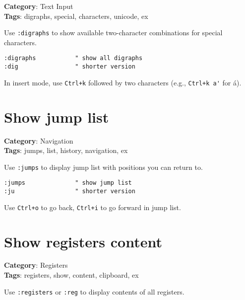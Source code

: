 {{{{{{\textbf{Category}: Text Input\\ \textbf{Tags}: digraphs, special, characters, unicode, ex
\vspace{0.5cm}

Use {\footnotesize \Verb§:digraphs§} to show available two-character combinations for special characters.

\begin{Exa*}{}
\begin{Verbatim}[fontsize=\footnotesize, breaklines, breakanywhere]
:digraphs           " show all digraphs
:dig                " shorter version
\end{Verbatim}
\end{Exa*}

In insert mode, use {\footnotesize \Verb§Ctrl+k§} followed by two characters (e.g., {\footnotesize \Verb§Ctrl+k a'§} for á).

\section{Show jump list}

\textbf{Category}: Navigation\\ \textbf{Tags}: jumps, list, history, navigation, ex
\vspace{0.5cm}

Use {\footnotesize \Verb§:jumps§} to display jump list with positions you can return to.

\begin{Exa*}{}
\begin{Verbatim}[fontsize=\footnotesize, breaklines, breakanywhere]
:jumps              " show jump list
:ju                 " shorter version
\end{Verbatim}
\end{Exa*}

Use {\footnotesize \Verb§Ctrl+o§} to go back, {\footnotesize \Verb§Ctrl+i§} to go forward in jump list.

\section{Show registers content}

\textbf{Category}: Registers\\ \textbf{Tags}: registers, show, content, clipboard, ex
\vspace{0.5cm}

Use {\footnotesize \Verb§:registers§} or {\footnotesize \Verb§:reg§} to display contents of all registers.

}}}}}}
